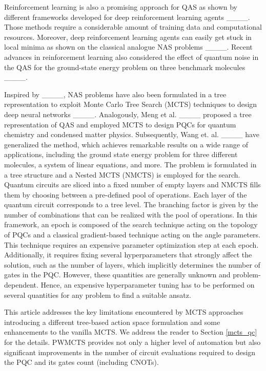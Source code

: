 Reinforcement learning is also a promising approach for QAS as shown by different frameworks developed for deep reinforcement learning agents ____. Those methods require a considerable amount of training data and computational resources. Moreover, deep reinforcement learning agents can easily get stuck in local minima as shown on the classical analogue NAS problems ____. Recent advances in reinforcement learning also considered the effect of quantum noise in the QAS for the ground-state energy problem on three benchmark molecules ____.

Inspired by ____, NAS problems have also been formulated in a tree representation to exploit Monte Carlo Tree Search (MCTS) techniques to design deep neural networks ____. Analogously, Meng et al. ____ proposed a tree representation of QAS and employed MCTS to design PQCs for quantum chemistry and condensed matter physics. Subsequently, Wang et. al. ____ have generalized the method, which achieves remarkable results on a wide range of applications, including the ground state energy problem for three different molecules, a system of linear equations, and more.  The problem is formulated in a tree structure and a Nested MCTS (NMCTS) is employed for the search. Quantum circuits are sliced into a fixed number of empty layers and NMCTS fills them by choosing between a pre-defined pool of operations. Each layer of the quantum circuit corresponds to a tree level. The branching factor is given by the number of combinations that can be realized with the pool of operations. In this framework, an epoch is composed of the search technique acting on the topology of PQCs and a classical gradient-based technique acting on the angle parameters. This technique requires an expensive parameter optimization step at each epoch. Additionally, it requires fixing several hyperparameters that strongly affect the solution, such as the number of layers, which implicitly determines the number of gates in the PQC. However, these quantities are generally unknown and problem-dependent. Hence, an expensive hyperparameter tuning has to be performed on several quantities for any problem to find a suitable ansatz. 

This article addresses the key limitations encountered by MCTS approaches introducing a different tree-based action space formulation and some enhancements to the vanilla MCTS. We address the reader to Section \ref{mcts_qc} for the details. PWMCTS provides not only a higher level of automation but also significant improvements in the number of circuit evaluations required to design the PQC and its gates count (including CNOTs).